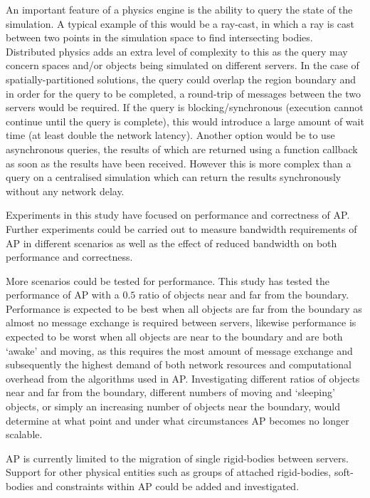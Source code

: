 An important feature of a physics engine is the ability to query the state of the simulation. A typical example of this would be a ray-cast, in which a ray is cast between two points in the simulation space to find intersecting bodies. %
Distributed physics adds an extra level of complexity to this as the query may concern spaces and/or objects being simulated on different servers. In the case of spatially-partitioned solutions, the query could overlap the region boundary and in order for the query to be completed, a round-trip of messages between the two servers would be required. If the query is blocking/synchronous (execution cannot continue until the query is complete), this would introduce a large amount of wait time (at least double the network latency). Another option would be to use asynchronous queries, the results of which are returned using a function callback as soon as the results have been received. However this is more complex than a query on a centralised simulation which can return the results synchronously without any network delay.

Experiments in this study have focused on performance and correctness of AP. Further experiments could be carried out to measure bandwidth requirements of AP in different scenarios as well as the effect of reduced bandwidth on both performance and correctness.

More scenarios could be tested for performance. This study has tested the performance of AP with a $0.5$ ratio of objects near and far from the boundary. Performance is expected to be best when all objects are far from the boundary as almost no message exchange is required between servers, likewise performance is expected to be worst when all objects are near to the boundary and are both `awake' and moving, as this requires the most amount of message exchange and subsequently the highest demand of both network resources and computational overhead from the algorithms used in AP. Investigating different ratios of objects near and far from the boundary, different numbers of moving and `sleeping' objects, or simply an increasing number of objects near the boundary, would determine at what point and under what circumstances AP becomes no longer scalable.

AP is currently limited to the migration of single rigid-bodies between servers. Support for other physical entities such as groups of attached rigid-bodies, soft-bodies and constraints within AP could be added and investigated.
